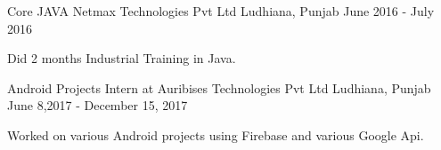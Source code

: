 


\begin{cventries}


\cventry
{Core JAVA} %
{Netmax Technologies Pvt Ltd } %
{Ludhiana, Punjab } %
{June 2016 - July 2016} %
{ %
\begin{cvitems}
\item {Did 2 months Industrial Training in Java.}
\end{cvitems}
}
\cventry
{Android Projects} %
{Intern at Auribises Technologies Pvt Ltd} %
{Ludhiana, Punjab } %
{June 8,2017 - December 15, 2017} %
{ %
\begin{cvitems}
\item {Worked on various Android projects using Firebase and various Google Api.}
\end{cvitems}
}
\end{cventries}






